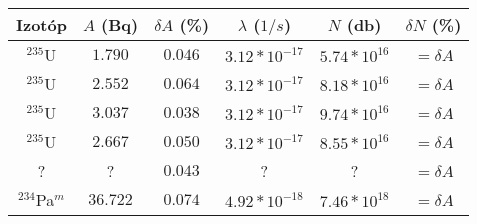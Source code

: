 \begin{center}
\begin{tabular}{|c|c|c|c|c|c|}
\hline
Izotóp 			 & $A$ (Bq) & $\delta A$ (\%) & $\lambda$ ($1/s$)   & $N$ (db)         & $\delta N$ (\%) \\
\hline
$^{235}$U 		 & $1.790$  & $0.046$ 		  & $3.12 * 10^{-17}$   & $5.74 * 10^{16}$ & $=\delta A$ \\
$^{235}$U 		 & $2.552$  & $0.064$ 		  & $3.12 * 10^{-17}$   & $8.18 * 10^{16}$ & $=\delta A$ \\
$^{235}$U 		 & $3.037$  & $0.038$ 		  & $3.12 * 10^{-17}$   & $9.74 * 10^{16}$ & $=\delta A$ \\
$^{235}$U        & $2.667$  & $0.050$ 		  & $3.12 * 10^{-17}$   & $8.55 * 10^{16}$ & $=\delta A$ \\
?                & ?        & $0.043$         & ?                   & ?                & $=\delta A$ \\
$^{234}$Pa$^{m}$ & $36.722$ & $0.074$ 		  & $4.92 * 10^{-18}$   & $7.46 * 10^{18}$ & $=\delta A$ \\
\hline
\end{tabular}
 \label{table:4}
\end{center}